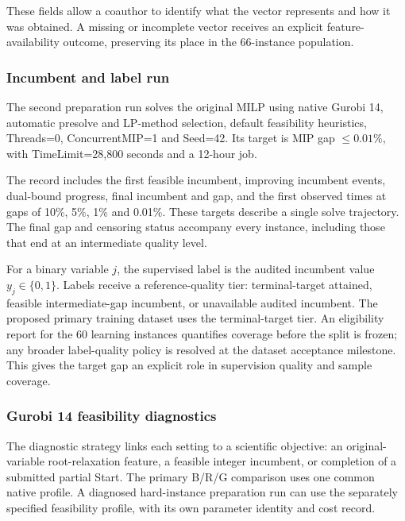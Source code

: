 \documentclass[
  british,
  10pt,
]{article}
\begin{document}
These fields allow a coauthor to identify what the vector represents and
how it was obtained. A missing or incomplete vector receives an explicit
feature-availability outcome, preserving its place in the 66-instance
population.

\subsubsection{Incumbent and label run}\label{incumbent-and-label-run}

The second preparation run solves the original MILP using native Gurobi
14, automatic presolve and LP-method selection, default feasibility
heuristics, Threads=0, ConcurrentMIP=1 and Seed=42. Its target is MIP
gap \(\leq0.01\%\), with TimeLimit=28,800 seconds and a 12-hour job.

The record includes the first feasible incumbent, improving incumbent
events, dual-bound progress, final incumbent and gap, and the first
observed times at gaps of 10\%, 5\%, 1\% and 0.01\%. These targets
describe a single solve trajectory. The final gap and censoring status
accompany every instance, including those that end at an intermediate
quality level.

For a binary variable \(j\), the supervised label is the audited
incumbent value \(y_j\in\{0,1\}\). Labels receive a reference-quality
tier: terminal-target attained, feasible intermediate-gap incumbent, or
unavailable audited incumbent. The proposed primary training dataset
uses the terminal-target tier. An eligibility report for the 60 learning
instances quantifies coverage before the split is frozen; any broader
label-quality policy is resolved at the dataset acceptance milestone.
This gives the target gap an explicit role in supervision quality and
sample coverage.

\subsubsection{Gurobi 14 feasibility
diagnostics}\label{gurobi-14-feasibility-diagnostics}

The diagnostic strategy links each setting to a scientific objective: an
original-variable root-relaxation feature, a feasible integer incumbent,
or completion of a submitted partial Start. The primary B/R/G comparison
uses one common native profile. A diagnosed hard-instance preparation
run can use the separately specified feasibility profile, with its own
parameter identity and cost record.
\end{document}
